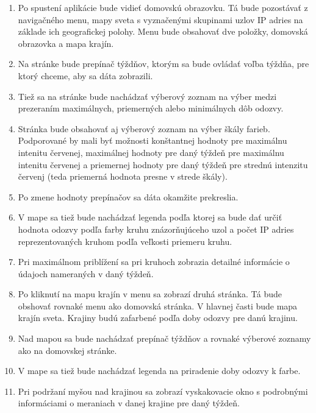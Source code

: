 \begin{enumerate}
    \item Po spustení aplikácie bude vidieť domovskú obrazovku. Tá bude pozostávať z navigačného menu, mapy sveta s vyznačenými skupinami 
    uzlov IP adries na základe ich geografickej polohy. Menu bude obsahovať dve položky, domovská obrazovka a mapa krajín.
    \item  Na stránke bude prepínač týždňov, 
    ktorým sa bude ovládať voľba týždňa, pre ktorý chceme, aby sa dáta zobrazili.
    \item Tiež sa na stránke bude nachádzať výberový zoznam na výber medzi prezeraním 
    maximálnych, priemerných alebo minimálnych dôb odozvy.
    \item Stránka bude obsahovať aj výberový zoznam na výber škály farieb. Podporované by mali byť možnosti konštantnej hodnoty pre maximálnu intenitu červenej,
    maximálnej hodnoty pre daný týždeň pre maximálnu intenitu červenej a priemernej hodnoty pre daný týždeň pre strednú intenzitu červenj (teda priemerná 
    hodnota presne v strede škály).
    \item Po zmene hodnoty prepínačov sa dáta okamžite prekreslia.
    \item V mape sa tiež bude nachádzať legenda podľa ktorej sa bude dať určiť hodnota odozvy podľa farby kruhu znázorňujúceho uzol a počet IP adries reprezentovaných 
    kruhom podľa veľkosti priemeru kruhu.
    \item Pri maximálnom priblížení sa pri kruhoch zobrazia detailné informácie o údajoch nameraných v daný týždeň.
    \item Po kliknutí na mapu krajín v menu sa zobrazí druhá stránka. Tá bude obshovať rovnaké menu ako domovská stránka. V hlavnej časti bude mapa krajín sveta. 
    Krajiny budú zafarbené podľa doby odozvy pre danú krajinu.
    \item Nad mapou sa bude nachádzať prepínač týždňov a rovnaké výberové zoznamy ako na domovskej stránke.
    \item V mape sa tiež bude nachádzať legenda na priradenie doby odozvy k farbe.
    \item Pri podržaní myšou nad krajinou sa zobrazí vyskakovacie okno s podrobnými informáciami o meraniach v danej krajine pre daný týždeň.
\end{enumerate}

